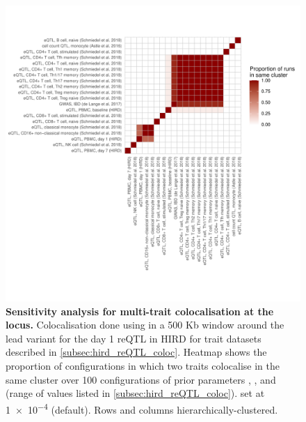 \begin{figure}
    \centering
    \includegraphics[width=1.0\textwidth,page=1]{mainmatter/figures/chapter_03/perform_coloc.gene_ENSG00000138031.sensitivityPlot_custom.pdf}
    \caption{
        \textbf{Sensitivity analysis for multi-trait colocalisation at the  locus.}
        Colocalisation done using  \autocite{foley2019FastEfficientColocalization} in a 500 Kb window around the lead variant for the day 1  \gls{reQTL} in \gls{HIRD} for trait datasets described in \cref{subsec:hird_reQTL_coloc}.
        Heatmap shows the proportion of configurations in which two traits colocalise in the same cluster over 100 configurations of prior parameters
        , , and  (range of values listed in \cref{subsec:hird_reQTL_coloc}).
         set at \num{1e-4} (default).
        Rows and columns hierarchically-clustered.
    }
    \label{fig:hird_reQTL_coloc_ADCY3_sensitivityPlotCustom}
\end{figure}

